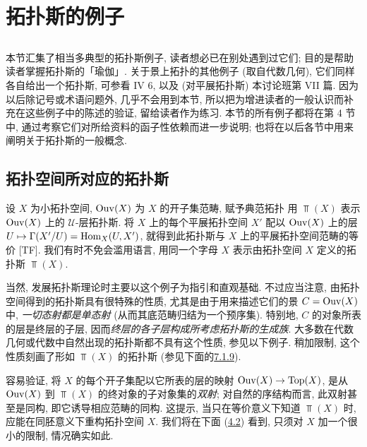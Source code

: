 

\section{拓扑斯的例子}

\setcounter{subsection}{-1}
\subsection{}
本节汇集了相当多典型的拓扑斯例子, 读者想必已在别处遇到过它们; 目的是帮助读者掌握拓扑斯的「瑜伽」. 关于景上拓扑的其他例子 (取自代数几何), 它们同样各自给出一个拓扑斯, 可参看  IV 6, 以及 (对平展拓扑斯) 本讨论班第 VII 篇. 因为以后除记号或术语问题外, 几乎不会用到本节, 所以把为增进读者的一般认识而补充在这些例子中的陈述的验证, 留给读者作为练习. 本节的所有例子都将在第 4 节中, 通过考察它们对所给资料的函子性依赖而进一步说明; 也将在以后各节中用来阐明关于拓扑斯的一般概念.

\subsection{拓扑空间所对应的拓扑斯}

设 $X$ 为小拓扑空间, $\operatorname{Ouv}(X)$ 为 $X$ 的开子集范畴, 赋予典范拓扑 
用 $\Top(X)$ 表示 $\operatorname{Ouv}(X)$ 上的 $𝒰$-层拓扑斯. 将 $X$ 上的每个平展拓扑空间 $X'$ 配以 $\operatorname{Ouv}(X)$ 上的层 $U\mapsto \Gamma(X'/U)=\operatorname{Hom}_X(U,X')$, 就得到此拓扑斯与 $X$ 上的平展拓扑空间范畴的等价 [TF]. 我们有时不免会滥用\pageoriginale 语言, 用同一个字母 $X$ 表示由拓扑空间 $X$ 定义的拓扑斯 $\Top(X)$.

当然, 发展拓扑斯理论时主要以这个例子为指引和直观基础. 不过应当注意, 由拓扑空间得到的拓扑斯具有很特殊的性质, 尤其是由于用来描述它们的景 $C=\operatorname{Ouv}(X)$ 中, \emph{一切态射都是单态射} (从而其底范畴归结为一个预序集). 特别地, $C$ 的对象所表的层是终层的子层, 因而\emph{终层的各子层构成所考虑拓扑斯的生成族}. 大多数在代数几何或代数中自然出现的拓扑斯都不具有这个性质, 参见以下例子. 稍加限制, 这个性质刻画了形如 $\Top(X)$ 的拓扑斯 (参见下面的\hyperref[IV.exer7.1.9]{7.1.9}).

容易验证, 将 $X$ 的每个开子集配以它所表的层的映射 $\operatorname{Ouv}(X)\rightarrow \operatorname{Top}(X)$, 是从 $\operatorname{Ouv}(X)$ 到 $\Top(X)$ 的终对象的子对象集的\emph{双射}; 对自然的序结构而言, 此双射甚至是同构, 即它诱导相应范畴的同构. 这提示, 当只在等价意义下知道 $\Top(X)$ 时, 应能在同胚意义下重构拓扑空间 $X$. 我们将在下面 (\hyperref[IV.subsec4.2]{4.2}) 看到, 只须对 $X$ 加一个很小的限制, 情况确实如此.

